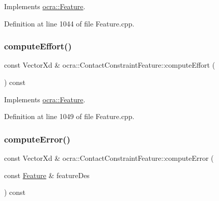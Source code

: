Implements \hyperlink{classocra_1_1Feature_a19626a241666fdae253af1f7b6f2acd7}{ocra\+::\+Feature}.



Definition at line 1044 of file Feature.\+cpp.

\hypertarget{classocra_1_1ContactConstraintFeature_a84b467c5da2810bef8a76525e617ad2d}{}\label{classocra_1_1ContactConstraintFeature_a84b467c5da2810bef8a76525e617ad2d} 
\subsubsection{\texorpdfstring{compute\+Effort()}{computeEffort()}\hspace{0.1cm}{\footnotesize\ttfamily [2/2]}}
{\footnotesize\ttfamily const Vector\+Xd \& ocra\+::\+Contact\+Constraint\+Feature\+::compute\+Effort (\begin{DoxyParamCaption}{ }\end{DoxyParamCaption}) const\hspace{0.3cm}{\ttfamily [virtual]}}



Implements \hyperlink{classocra_1_1Feature_ae43f2ffc54862d6ddc0b02fd39431eb6}{ocra\+::\+Feature}.



Definition at line 1049 of file Feature.\+cpp.

\hypertarget{classocra_1_1ContactConstraintFeature_a2d5b3c766e22c541e416ca52d14e78df}{}\label{classocra_1_1ContactConstraintFeature_a2d5b3c766e22c541e416ca52d14e78df} 
\subsubsection{\texorpdfstring{compute\+Error()}{computeError()}\hspace{0.1cm}{\footnotesize\ttfamily [1/2]}}
{\footnotesize\ttfamily const Vector\+Xd \& ocra\+::\+Contact\+Constraint\+Feature\+::compute\+Error (\begin{DoxyParamCaption}\item[{const \hyperlink{classocra_1_1Feature}{Feature} \&}]{feature\+Des }\end{DoxyParamCaption}) const\hspace{0.3cm}{\ttfamily [virtual]}}



